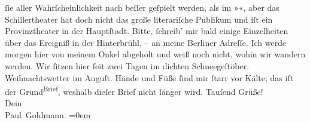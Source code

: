 \begin{ledgroupsized}[t]{13cm}
               ſie aller Wahrſcheinlichkeit nach beſſer geſpielt werden, als im »\label{K_L03219-4v}\label{K_L03219-4h}«, aber das Schillertheater hat doch nicht
               das große literariſche Publikum und iſt ein Provinztheater in der \strikeout{\textcolor{gray}{H}}{ }Hauptſtadt.\pend
           \pstart
           Bitte, ſchreib’ mir bald {\pb}einige Einzelheiten über
               das Ereigniß in der Hinterbrühl, – an meine Berliner Adreſſe. Ich werde morgen{ }hier von meinem Onkel abgeholt und weiß noch
               nicht, wohin wir wandern werden. Wir ſitzen hier ſeit zwei Tagen im dichten Schneegeſtöber.
               Weihnachtswetter im Auguſt. Hände und Füße ſind mir ſtarr vor Kälte; das iſt der \introOben{}Grund\introOben{}{ }\substVorne{}\textsuperscript{Brief}\substDazwischen{}\substHinten{}, weshalb  dieſer Brief nicht länger
               wird.\pend
           \pstart
           {\pb}Tauſend Grüße! {\\[\baselineskip]}Dein {\\[\baselineskip]}\spacefill\mbox{Paul Goldmann.}\pend
           \leftskip=0em{}
         
         \endnumbering{}\end{ledgroupsized}  \newcommand{\dateiname}{L03219}\newcommand{\titel}{Paul Goldmann an Arthur Schnitzler, 12. 8. [1902]}\newcommand{\editorInnen}{Martin Anton Müller und Laura Untner}
      